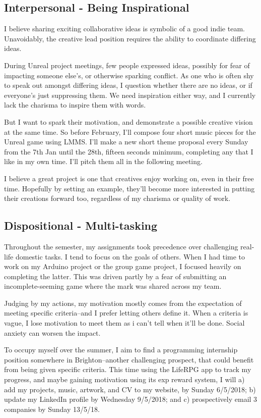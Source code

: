 \documentclass{scrartcl}
\begin{document}
\subsection{Interpersonal - Being Inspirational} %

I believe sharing exciting collaborative ideas is symbolic of a good indie team. Unavoidably, the creative lead position requires the ability to coordinate differing ideas.

During Unreal project meetings, few people expressed ideas, possibly for fear of impacting someone else's, or otherwise sparking conflict. As one who is often shy to speak out amongst differing ideas, I question whether there are no ideas, or if everyone's just suppressing them. We need inspiration either way, and I currently lack the charisma to inspire them with words.

But I want to spark their motivation, and demonstrate a possible creative vision at the same time. So before February, I'll compose four short music pieces for the Unreal game using LMMS. I'll make a new short theme proposal every Sunday from the 7th Jan until the 28th, fifteen seconds minimum, completing any that I like in my own time. I'll pitch them all in the following meeting.

I believe a great project is one that creatives enjoy working on, even in their free time. Hopefully by setting an example, they'll become more interested in putting their creations forward too, regardless of my charisma or quality of work.

\subsection{Dispositional - Multi-tasking} %

Throughout the semester, my assignments took precedence over challenging real-life domestic tasks. I tend to focus on the goals of others. When I had time to work on my Arduino project or the group game project, I focused heavily on completing the latter. This was driven partly by a fear of submitting an incomplete-seeming game where the mark was shared across my team.

Judging by my actions, my motivation mostly comes from the expectation of meeting specific criteria--and I prefer letting others define it. When a criteria is vague, I lose motivation to meet them as i can't tell when it'll be done. Social anxiety can worsen the impact. 

To occupy myself over the summer, I aim to find a programming internship position somewhere in Brighton--another challenging prospect, that could benefit from being given specific criteria. This time using the LifeRPG app to track my progress, and maybe gaining motivation using its exp reward system, I will a) add my projects, music, artwork, and CV to my website, by Sunday 6/5/2018; b) update my LinkedIn profile by Wednesday 9/5/2018; and c) prospectively email 3 companies by Sunday 13/5/18.
\end{document}
